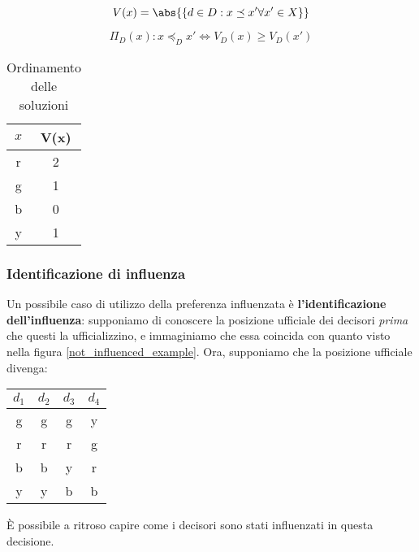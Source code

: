 \documentclass[\main/main.tex]{subfiles}
\begin{document}
\[
	V(x) = \abs{\{d \in D: x \preceq x' \forall x' \in X \}}
\]

\[
	\Pi_D(x): x \preceq_D x' \Leftrightarrow V_D(x) \geq V_D(x')
\]

\begin{table}
	\begin{tabular}{|c|c|}
		\hline
		$x$ & V(x) \\
		\hline
		r   & 2    \\
		\hline
		g   & 1    \\
		\hline
		b   & 0    \\
		\hline
		y   & 1    \\
		\hline
	\end{tabular}
	\caption{Ordinamento delle soluzioni}
\end{table}

\subsubsection{Identificazione di influenza}
Un possibile caso di utilizzo della preferenza influenzata è \textbf{l'identificazione dell'influenza}: supponiamo di conoscere la posizione ufficiale dei decisori \textit{prima} che questi la ufficializzino, e immaginiamo che essa coincida con quanto visto nella figura \ref{not_influenced_example}. Ora, supponiamo che la posizione ufficiale divenga:

\begin{table}
	\begin{tabular}{|c|c|c|c|}
		\hline
		\rowcolor{gray!10} $d_1$ & $d_2$                   & $d_3$                   & $d_4$                   \\
		\hline
		\cellcolor{green!50} g   & \cellcolor{green!50} g  & \cellcolor{green!50} g  & \cellcolor{yellow!50} y \\
		\hline
		\cellcolor{red!50} r     & \cellcolor{red!50} r    & \cellcolor{red!50} r    & \cellcolor{green!50} g  \\
		\hline
		\cellcolor{blue!50} b    & \cellcolor{blue!50} b   & \cellcolor{yellow!50} y & \cellcolor{red!50} r    \\
		\hline
		\cellcolor{yellow!50} y  & \cellcolor{yellow!50} y & \cellcolor{blue!50} b   & \cellcolor{blue!50} b   \\
		\hline
	\end{tabular}
	\label{influenced_example}
\end{table}

È possibile a ritroso capire come i decisori sono stati influenzati in questa decisione.
\end{document}
